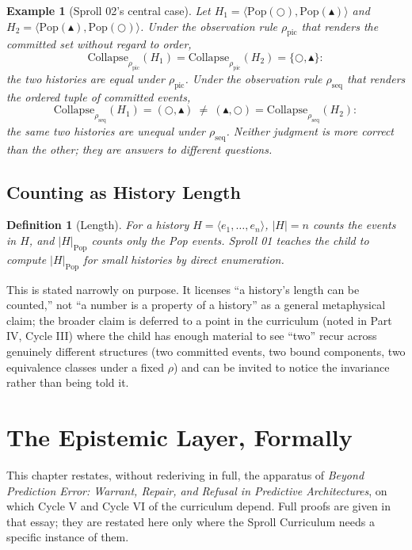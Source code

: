 \documentclass[11pt,twoside]{book}
\newtheorem{definition}[theorem]{Definition}
\newtheorem{example}[theorem]{Example}
\begin{document}
\begin{example}[Sproll 02's central case]
Let $H_1 = \langle \mathrm{Pop}(\bigcirc), \mathrm{Pop}(\blacktriangle) \rangle$ and $H_2 = \langle \mathrm{Pop}(\blacktriangle), \mathrm{Pop}(\bigcirc) \rangle$. Under the observation rule $\rho_{\mathrm{pic}}$ that renders the committed set without regard to order,
\[
\mathrm{Collapse}_{\rho_{\mathrm{pic}}}(H_1) = \mathrm{Collapse}_{\rho_{\mathrm{pic}}}(H_2) = \{\bigcirc, \blacktriangle\}:
\]
the two histories are equal under $\rho_{\mathrm{pic}}$. Under the observation rule $\rho_{\mathrm{seq}}$ that renders the ordered tuple of committed events,
\[
\mathrm{Collapse}_{\rho_{\mathrm{seq}}}(H_1) = (\bigcirc, \blacktriangle) \ \neq \ (\blacktriangle, \bigcirc) = \mathrm{Collapse}_{\rho_{\mathrm{seq}}}(H_2):
\]
the same two histories are unequal under $\rho_{\mathrm{seq}}$. Neither judgment is more correct than the other; they are answers to different questions.
\end{example}

\section{Counting as History Length}

\begin{definition}[Length]
For a history $H = \langle e_1, \ldots, e_n \rangle$, $|H| = n$ counts the events in $H$, and $|H|_{\mathrm{Pop}}$ counts only the Pop events. Sproll 01 teaches the child to compute $|H|_{\mathrm{Pop}}$ for small histories by direct enumeration.
\end{definition}

This is stated narrowly on purpose. It licenses ``a history's length can be counted,'' not ``a number is a property of a history'' as a general metaphysical claim; the broader claim is deferred to a point in the curriculum (noted in Part IV, Cycle III) where the child has enough material to see ``two'' recur across genuinely different structures (two committed events, two bound components, two equivalence classes under a fixed $\rho$) and can be invited to notice the invariance rather than being told it.

\chapter{The Epistemic Layer, Formally}

This chapter restates, without rederiving in full, the apparatus of \emph{Beyond Prediction Error: Warrant, Repair, and Refusal in Predictive Architectures}, on which Cycle V and Cycle VI of the curriculum depend. Full proofs are given in that essay; they are restated here only where the Sproll Curriculum needs a specific instance of them.
\end{document}
